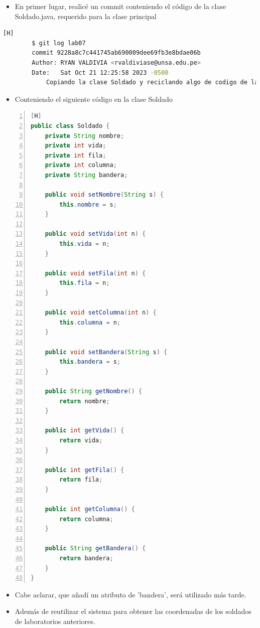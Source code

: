 \documentclass{article}
\begin{document}
	\begin{itemize}	
		\item En primer lugar, realicé un commit conteniendo el código de la clase Soldado.java, requerido para la clase principal
	\end{itemize}	
	\begin{lstlisting}[language=bash,caption={Obteniendo la clase Soldado}][H]
		$ git log lab07
		commit 9228a8c7c441745ab690009dee69fb3e8bdae06b
		Author: RYAN VALDIVIA <rvaldiviase@unsa.edu.pe>
		Date:   Sat Oct 21 12:25:58 2023 -0500
			Copiando la clase Soldado y reciclando algo de codigo de laboratorios anteriores
	\end{lstlisting}
	\begin{itemize}	
		\item Conteniendo el siguiente código en la clase Soldado
	\end{itemize}
	\begin{lstlisting}[language=java,caption={Clase Soldado}, numbers=left][H]
public class Soldado {
    private String nombre;
    private int vida;
    private int fila;
    private int columna;
    private String bandera;

    public void setNombre(String s) {
        this.nombre = s;
    }

    public void setVida(int n) {
        this.vida = n;
    }

    public void setFila(int n) {
        this.fila = n;
    }

    public void setColumna(int n) {
        this.columna = n;
    }

    public void setBandera(String s) {
        this.bandera = s;
    }

    public String getNombre() {
        return nombre;
    }

    public int getVida() {
        return vida;
    }

    public int getFila() {
        return fila;
    }

    public int getColumna() {
        return columna;
    }

    public String getBandera() {
        return bandera;
    }
}
	\end{lstlisting}
	\begin{itemize}
		\item Cabe aclarar, que añadí un atributo de 'bandera', será utilizado más tarde.
		\item Además de reutilizar el sistema para obtener las coordenadas de los soldados de laboratorios anteriores.
	\end{itemize}
\end{document}
